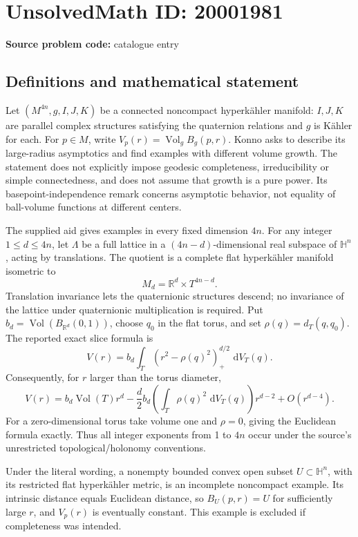 \documentclass[11pt]{article}
\newcommand{\R}{\mathbb{R}}
\newcommand{\dd}{\,\mathrm{d}}
\begin{document}
\section*{UnsolvedMath ID: 20001981}
\textbf{Source problem code:} catalogue entry
\subsection{Definitions and mathematical statement}
Let \((M^{4n},g,I,J,K)\) be a connected noncompact hyperk\"ahler manifold: \(I,J,K\) are parallel complex structures satisfying the quaternion relations and \(g\) is K\"ahler for each. For \(p\in M\), write \(V_p(r)=\operatorname{Vol}_g B_g(p,r)\). Konno asks to describe its large-radius asymptotics and find examples with different volume growth. The statement does not explicitly impose geodesic completeness, irreducibility or simple connectedness, and does not assume that growth is a pure power. Its basepoint-independence remark concerns asymptotic behavior, not equality of ball-volume functions at different centers.

The supplied aid gives examples in every fixed dimension \(4n\). For any integer \(1\leq d\leq4n\), let \(\Lambda\) be a full lattice in a \((4n-d)\)-dimensional real subspace of \(\mathbb H^n\), acting by translations. The quotient is a complete flat hyperk\"ahler manifold isometric to
\[
M_d=\R^d\times T^{4n-d}.
\]
Translation invariance lets the quaternionic structures descend; no invariance of the lattice under quaternionic multiplication is required. Put \(b_d=\operatorname{Vol}(B_{\R^d}(0,1))\), choose \(q_0\) in the flat torus, and set \(\rho(q)=d_T(q,q_0)\). The reported exact slice formula is
\[
V(r)=b_d\int_T(r^2-\rho(q)^2)_+^{d/2}\,\dd V_T(q).
\]
Consequently, for \(r\) larger than the torus diameter,
\[
V(r)=b_d\operatorname{Vol}(T)r^d
-\frac d2 b_d\left(\int_T\rho(q)^2\,\dd V_T(q)\right)r^{d-2}
+O(r^{d-4}).
\]
For a zero-dimensional torus take volume one and \(\rho=0\), giving the Euclidean formula exactly. Thus all integer exponents from 1 to \(4n\) occur under the source's unrestricted topological/holonomy conventions.

Under the literal wording, a nonempty bounded convex open subset \(U\subset\mathbb H^n\), with its restricted flat hyperk\"ahler metric, is an incomplete noncompact example. Its intrinsic distance equals Euclidean distance, so \(B_U(p,r)=U\) for sufficiently large \(r\), and \(V_p(r)\) is eventually constant. This example is excluded if completeness was intended.
\end{document}
